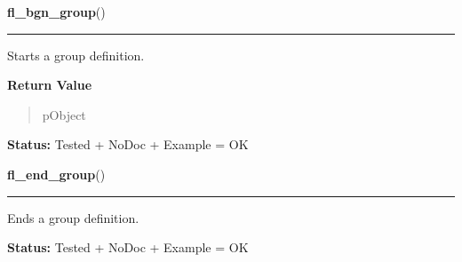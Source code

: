 \hspace{.8\funcindent}\begin{boxedminipage}{\funcwidth}

    \raggedright \textbf{fl\_bgn\_group}()

    \vspace{-1.5ex}

    \rule{\textwidth}{0.5\fboxrule}
\setlength{\parskip}{2ex}
    Starts a group definition.

\setlength{\parskip}{1ex}
      \textbf{Return Value}
    \vspace{-1ex}

      \begin{quote}
      pObject

      \end{quote}

\textbf{Status:} Tested + NoDoc + Example = OK



    \end{boxedminipage}

    \label{xformslib:library:fl_end_group}

    \vspace{0.5ex}

\hspace{.8\funcindent}\begin{boxedminipage}{\funcwidth}

    \raggedright \textbf{fl\_end\_group}()

    \vspace{-1.5ex}

    \rule{\textwidth}{0.5\fboxrule}
\setlength{\parskip}{2ex}
    Ends a group definition.

\setlength{\parskip}{1ex}
\textbf{Status:} Tested + NoDoc + Example = OK



    \end{boxedminipage}

    \label{xformslib:library:fl_addto_group}

    \vspace{0.5ex}

